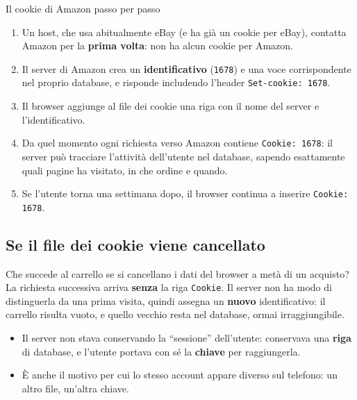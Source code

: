 \begin{esempio}{Il cookie di Amazon passo per passo}
\begin{enumerate}
    \item Un host, che usa abitualmente eBay (e ha già un cookie per eBay), contatta Amazon per la
          \textbf{prima volta}: non ha alcun cookie per Amazon.
    \item Il server di Amazon crea un \textbf{identificativo} (\texttt{1678}) e una voce corrispondente nel
          proprio database, e risponde includendo l'header \texttt{Set-cookie: 1678}.
    \item Il browser aggiunge al file dei cookie una riga con il nome del server e l'identificativo.
    \item Da quel momento ogni richiesta verso Amazon contiene \texttt{Cookie: 1678}: il server può
          tracciare l'attività dell'utente nel database, sapendo esattamente quali pagine ha visitato, in che
          ordine e quando.
    \item Se l'utente torna una settimana dopo, il browser continua a inserire \texttt{Cookie: 1678}.
\end{enumerate}
\end{esempio}

\subsection{Se il file dei cookie viene cancellato}

Che succede al carrello se si cancellano i dati del browser a metà di un acquisto? La richiesta successiva
arriva \textbf{senza} la riga \texttt{Cookie}. Il server non ha modo di distinguerla da una prima visita, quindi
assegna un \textbf{nuovo} identificativo: il carrello risulta vuoto, e quello vecchio resta nel database,
ormai irraggiungibile.

\begin{itemize}
    \item Il server non stava conservando la ``sessione'' dell'utente: conservava una \textbf{riga} di
          database, e l'utente portava con sé la \textbf{chiave} per raggiungerla.
    \item È anche il motivo per cui lo stesso account appare diverso sul telefono: un altro file, un'altra chiave.
\end{itemize}


